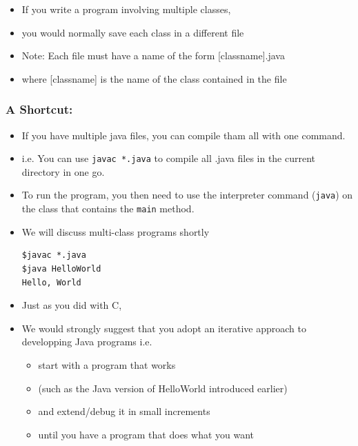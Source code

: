\documentclass{beamer}
\begin{document}
\begin{frame}[fragile]
\begin{itemize}
\item If you write a program involving multiple classes,
\item you would normally save each  class in a different file
\item Note: Each file must have a name of the form [classname].java
\item where [classname] is the name of the class contained in the file
\end{itemize}
\end{frame}

\begin{frame}[fragile]
\frametitle{A Shortcut:}
\begin{itemize}
\item If you have multiple java files, you can compile tham all with one command. 
\item i.e. You can use \lstinline!javac *.java! to compile all .java files in the current directory in one go.
\item To run the program, you then need to use the interpreter command (\lstinline!java!) on the class that contains the \lstinline!main! method. 
\item We will discuss multi-class programs shortly
\begin{block}{}
\begin{lstlisting}
$javac *.java
$java HelloWorld
Hello, World
\end{lstlisting}
\end{block}
\end{itemize}
\end{frame}

\begin{frame}\begin{itemize}

\item Just as you did with C,

\item We would strongly suggest that you adopt an iterative approach to
developping Java programs i.e.

\begin{itemize}
\item start with a program that works 
\item (such as the Java version of HelloWorld introduced earlier)
\item and extend/debug it in small increments
\item until you have a program that does what you want
\end{itemize}
\end{itemize}\end{frame}
\end{document}

